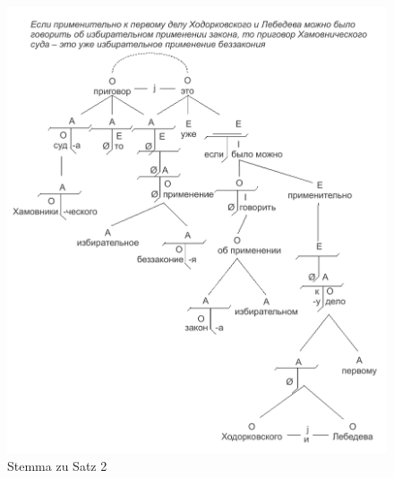 \begin{figure}
    \begin{center}
        \includegraphics{anhang_a/stemma2}
        \caption{Stemma zu Satz 2}
        \label{fig:stemma2}
    \end{center}
\end{figure}

